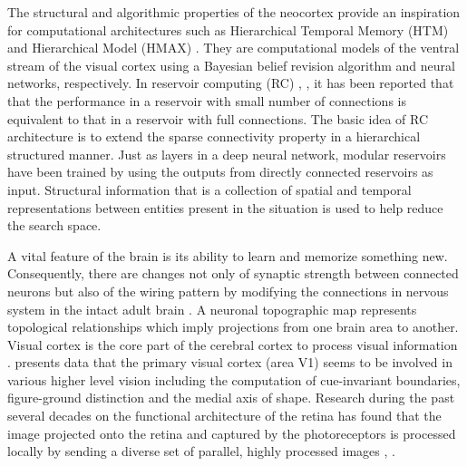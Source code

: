\documentclass[letterpaper, 10 pt, conference]{ieeeconf}  %
\begin{document}
The structural and algorithmic properties of the neocortex \cite{schmidhuber2015deep} provide an inspiration for computational architectures such as Hierarchical Temporal Memory (HTM) \cite{Hawkins2004} and  Hierarchical Model (HMAX) \cite{Riesenhuber1999}.
They are computational models of the ventral stream of the visual cortex using a Bayesian belief revision algorithm and neural networks, respectively.
In reservoir computing (RC) \cite{Lukosevicius2009}, \cite{DeAzambuja2016a}, it has been reported that that the performance in a reservoir with small number of connections is equivalent to that in a reservoir with full connections.
The basic idea of RC architecture is to extend the sparse connectivity property in a hierarchical structured manner.
Just as layers in a deep neural network, modular reservoirs have been trained by using the outputs from directly connected reservoirs as input.
Structural information that is a collection of spatial and temporal representations between entities present in the situation is used to help reduce the search space.

A vital feature of the brain is its ability to learn and memorize something new. Consequently, there are changes not only of synaptic strength between connected neurons but also of the wiring pattern by modifying the connections  in nervous system in the intact adult brain \cite{albieri2015rapid}.
A neuronal topographic map represents topological relationships which imply projections from one brain area to another.
Visual cortex is the core part of the cerebral cortex to process visual information \cite{katzner2009local}.
\cite{lee1998role} presents data that the primary visual cortex (area V1) seems to be involved in various higher level vision including the computation of cue-invariant boundaries, figure-ground distinction and the medial axis of shape.
Research during the past several decades on the functional architecture of the retina has found that the image projected onto the retina and captured by the photoreceptors is processed locally by sending a diverse set of parallel, highly processed images \cite{roska2014retina}, \cite{Sanes2015}.
\end{document}

